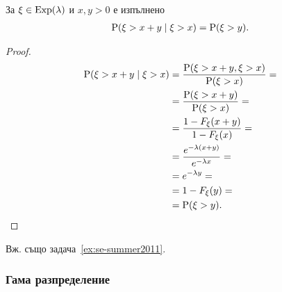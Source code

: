 \documentclass[numbers=endperiod, bibliography=totocnumbered]{scrartcl}
\begin{document}
\begin{theorem}\label{thm:memorylessness}
  За \( \xi \in \operatorname{Exp}(\lambda) \) и \( x, y > 0 \) е изпълнено
  \begin{align*}
    \operatorname{P}(\xi > x + y \mid \xi > x) = \operatorname{P}(\xi > y).
  \end{align*}
\end{theorem}
\begin{proof}
  \begin{align*}
    \operatorname{P}(\xi > x + y \mid \xi > x)
    &=
    \frac {\operatorname{P}(\xi > x + y, \xi > x)} {\operatorname{P}(\xi > x)}
    = \\ &=
    \frac {\operatorname{P}(\xi > x + y)} {\operatorname{P}(\xi > x)}
    = \\ &=
    \frac {1-F_\xi(x+y)} {1-F_\xi(x)}
    = \\ &=
    \frac {e^{-\lambda(x+y)}} {e^{-\lambda x}}
    = \\ &=
    e^{-\lambda y}
    = \\ &=
    1-F_\xi(y)
    = \\ &=
    \operatorname{P}(\xi > y).
  \end{align*}
\end{proof}

Вж. също задача~\ref{ex:se-summer2011}.

\subsubsection{Гама разпределение}\label{dist:gamma}
\end{document}
